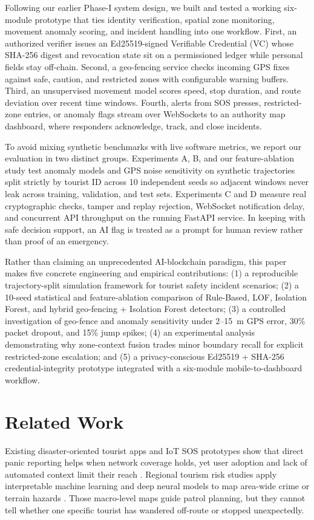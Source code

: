 \documentclass[conference]{IEEEtran}
\begin{document}
Following our earlier Phase-I system design, we built and tested a working six-module prototype that ties identity verification, spatial zone monitoring, movement anomaly scoring, and incident handling into one workflow. First, an authorized verifier issues an Ed25519-signed Verifiable Credential (VC) whose SHA-256 digest and revocation state sit on a permissioned ledger while personal fields stay off-chain. Second, a geo-fencing service checks incoming GPS fixes against safe, caution, and restricted zones with configurable warning buffers. Third, an unsupervised movement model scores speed, stop duration, and route deviation over recent time windows. Fourth, alerts from SOS presses, restricted-zone entries, or anomaly flags stream over WebSockets to an authority map dashboard, where responders acknowledge, track, and close incidents.

To avoid mixing synthetic benchmarks with live software metrics, we report our evaluation in two distinct groups. Experiments A, B, and our feature-ablation study test anomaly models and GPS noise sensitivity on synthetic trajectories split strictly by tourist ID across 10 independent seeds so adjacent windows never leak across training, validation, and test sets. Experiments C and D measure real cryptographic checks, tamper and replay rejection, WebSocket notification delay, and concurrent API throughput on the running FastAPI service. In keeping with safe decision support, an AI flag is treated as a prompt for human review rather than proof of an emergency.

Rather than claiming an unprecedented AI-blockchain paradigm, this paper makes five concrete engineering and empirical contributions: (1) a reproducible trajectory-split simulation framework for tourist safety incident scenarios; (2) a 10-seed statistical and feature-ablation comparison of Rule-Based, LOF, Isolation Forest, and hybrid geo-fencing + Isolation Forest detectors; (3) a controlled investigation of geo-fence and anomaly sensitivity under 2--15~m GPS error, 30\% packet dropout, and 15\% jump spikes; (4) an experimental analysis demonstrating why zone-context fusion trades minor boundary recall for explicit restricted-zone escalation; and (5) a privacy-conscious Ed25519 + SHA-256 credential-integrity prototype integrated with a six-module mobile-to-dashboard workflow.

\section{Related Work}
Existing disaster-oriented tourist apps and IoT SOS prototypes show that direct panic reporting helps when network coverage holds, yet user adoption and lack of automated context limit their reach \cite{aliperti2020,chiranjeevi2026}. Regional tourism risk studies apply interpretable machine learning and deep neural models to map area-wide crime or terrain hazards \cite{george2024,premananthan2024,li2026,josephi2026,hakyemez2025}. Those macro-level maps guide patrol planning, but they cannot tell whether one specific tourist has wandered off-route or stopped unexpectedly.
\end{document}
